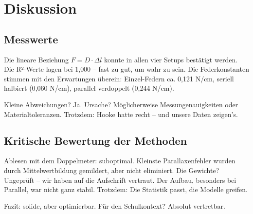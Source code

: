 \documentclass[../main.tex]{subfiles} %
\begin{document}
\chapter{Diskussion}\label{ch:diskussion}

    \section{Messwerte}\label{sec:messwerte}


        Die lineare Beziehung $F = D \cdot \Delta l$ konnte in allen vier Setups bestätigt werden. Die R²-Werte lagen bei 1{,}000 – fast zu gut, um wahr zu sein. Die Federkonstanten stimmen mit den Erwartungen überein: Einzel-Federn ca. 0{,}121 N/cm, seriell halbiert (0{,}060 N/cm), parallel verdoppelt (0{,}244 N/cm).

        Kleine Abweichungen? Ja. Ursache? Möglicherweise Messungenauigkeiten oder Materialtoleranzen. Trotzdem: Hooke hatte recht – und unsere Daten zeigen’s.

    \section{Kritische Bewertung der Methoden}\label{sec:kritische-bewertung-der-methoden}


        Ablesen mit dem Doppelmeter: suboptimal. Kleinste Parallaxenfehler wurden durch Mittelwertbildung gemildert, aber nicht eliminiert. Die Gewichte? Ungeprüft – wir haben auf die Aufschrift vertraut. Der Aufbau, besonders bei Parallel, war nicht ganz stabil. Trotzdem: Die Statistik passt, die Modelle greifen.

        Fazit: solide, aber optimierbar. Für den Schulkontext? Absolut vertretbar.
\end{document}

